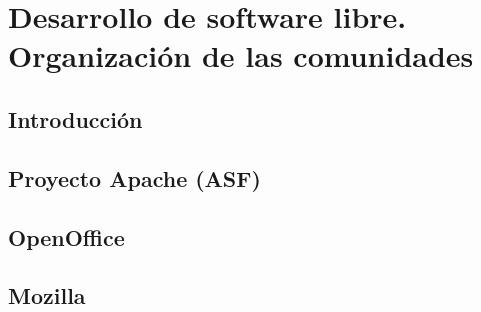 \chapter{Desarrollo de software libre. Organizaci\'on de las comunidades}
\label{CHAP5:Development}
\section{Introducci\'on}
\section{Proyecto Apache (ASF)}
\section{OpenOffice}
\section{Mozilla}